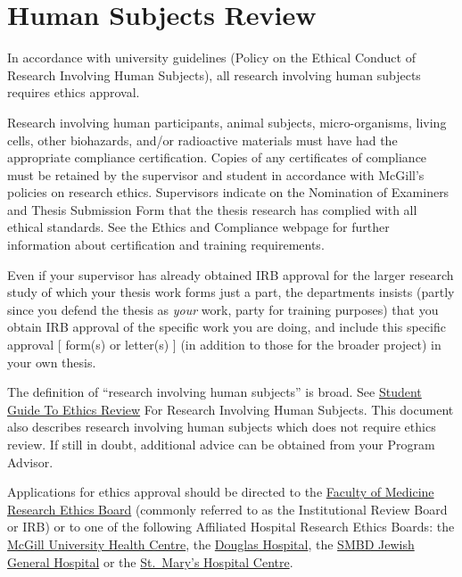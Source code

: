 \documentclass[
  openany]{book}
\begin{document}
\hypertarget{human-subjects-review}{%
\section{Human Subjects Review}\label{human-subjects-review}}

In accordance with university guidelines (Policy on the Ethical Conduct of Research Involving Human Subjects), all research involving human subjects requires ethics approval.

Research involving human participants, animal subjects, micro-organisms, living cells, other biohazards, and/or radioactive materials must have had the appropriate compliance certification. Copies of any certificates of compliance must be retained by the supervisor and student in accordance with McGill's policies on research ethics. Supervisors indicate on the Nomination of Examiners and Thesis Submission Form that the thesis research has complied with all ethical standards. See the Ethics and Compliance webpage for further information about certification and training requirements.

Even if your supervisor has already obtained IRB approval for the larger research study of which your thesis work forms just a part, the departments insists (partly since you defend the thesis as \emph{your} work, party for training purposes) that you obtain IRB approval of the specific work you are doing, and include this specific approval {[} form(s) or letter(s) {]} (in addition to those for the broader project) in your own thesis.

The definition of ``research involving human subjects'' is broad. See \href{https://www.mcgill.ca/research/researchers/compliance/human}{Student Guide To Ethics Review} For Research Involving Human Subjects. This document also describes research involving human subjects which does not require ethics review. If still in doubt, additional advice can be obtained from your Program Advisor.

Applications for ethics approval should be directed to the \href{https://www.mcgill.ca/medresearch/ethics}{Faculty of Medicine Research Ethics Board} (commonly referred to as the Institutional Review Board or IRB) or to one of the following Affiliated Hospital Research Ethics Boards: the \href{https://muhc.ca/cae/page/research-ethics}{McGill University Health Centre}, the \href{http://www.douglas.qc.ca/page/ethics}{Douglas Hospital}, the \href{http://www.jgh.ca/en/ResearchEthicsCommittee}{SMBD Jewish General Hospital} or the \href{http://www.stmarysresearch.ca/en/research_review/research-review}{St.~Mary's Hospital Centre}.
\end{document}

